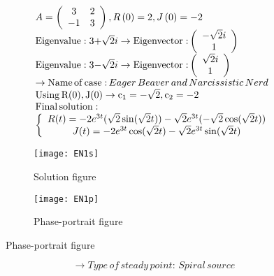 \documentclass[a4paper]{article}
\begin{document}
\[\begin{array}{l}
A = \left( {\begin{array}{*{20}{c}}
3&2\\
{ - 1}&3
\end{array}} \right),R\left( 0 \right) = 2,J\left( 0 \right) =  - 2\\
{\rm{Eigenvalue:3 + }}\sqrt 2 i \to {\rm{Eigenvector:}}\left( {\begin{array}{*{20}{c}}
{ - \sqrt 2 i}\\
1
\end{array}} \right)\\
{\rm{Eigenvalue:3 - }}\sqrt 2 i \to {\rm{Eigenvector:}}\left( {\begin{array}{*{20}{c}}
{\sqrt 2 i}\\
1
\end{array}} \right)\\
 \to {\rm{Name}}\,{\rm{of}}\,{\rm{case:}}\,Eager\,Beaver\,and\,Narcissistic\,Nerd\\
{\rm{Using}}\,{\rm{R(0), J(0)}} \to {{\rm{c}}_1} =  - \sqrt 2 ,{\rm{ }}{{\rm{c}}_2} =  - 2\\
{\rm{Final}}\,{\rm{solution:}}\\
\left\{ {\begin{array}{*{20}{c}}
{R(t) =  - 2{e^{3t}}(\sqrt 2 \sin (\sqrt 2 t)) - \sqrt 2 {e^{3t}}( - \sqrt 2 \cos (\sqrt 2 t))}\\
{J(t) =  - 2{e^{3t}}\cos (\sqrt 2 t) - \sqrt 2 {e^{3t}}\sin (\sqrt 2 t)}
\end{array}} \right.
\end{array}\]
\begin{figure}[H]
\centering
\begin{subfigure}{.5\textwidth}
  \centering
  \texttt{[image: EN1s]}
  \caption*{Solution figure}
\end{subfigure}%
\begin{subfigure}{.5\textwidth}
  \centering
  \texttt{[image: EN1p]}
  \caption*{Phase-portrait figure}
\end{subfigure}
\end{figure}
\[  \to  Type\,of\,steady\,point:\,Spiral\,source\]
\end{document}
